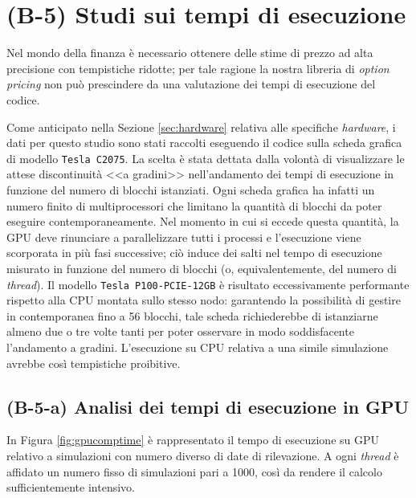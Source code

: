 \section{(B-5) Studi sui tempi di esecuzione} \label{sec:comptime}

Nel mondo della finanza è necessario ottenere delle stime di prezzo ad alta precisione con tempistiche ridotte; per tale ragione la nostra libreria di \textit{option pricing} non può prescindere da una valutazione dei tempi di esecuzione del codice.

Come anticipato nella Sezione \ref{sec:hardware} relativa alle specifiche \textit{hardware}, i dati per questo studio sono stati raccolti eseguendo il codice sulla scheda grafica di modello \verb|Tesla C2075|. La scelta è stata dettata dalla volontà di visualizzare le attese discontinuità <<a gradini>> nell'andamento dei tempi di esecuzione in funzione del numero di blocchi istanziati. Ogni scheda grafica ha infatti un numero finito di multiprocessori che limitano la quantità di blocchi da poter eseguire contemporaneamente. Nel momento in cui si eccede questa quantità, la GPU deve rinunciare a parallelizzare tutti i processi e l'esecuzione viene scorporata in più fasi successive; ciò induce dei salti nel tempo di esecuzione misurato in funzione del numero di blocchi (o, equivalentemente, del numero di \textit{thread}).
Il modello \verb|Tesla P100-PCIE-12GB| è risultato eccessivamente performante rispetto alla CPU montata sullo stesso nodo: garantendo la possibilità di gestire in contemporanea fino a 56 blocchi, tale scheda richiederebbe di istanziarne almeno due o tre volte tanti per poter osservare in modo soddisfacente l'andamento a gradini. L'esecuzione su CPU relativa a una simile simulazione avrebbe così tempistiche proibitive.

\subsection{(B-5-a) Analisi dei tempi di esecuzione in GPU}
In Figura \ref{fig:gpucomptime} è rappresentato il tempo di esecuzione su GPU relativo a simulazioni con numero diverso di date di rilevazione. A ogni \textit{thread} è affidato un numero fisso di simulazioni pari a 1000, così da rendere il calcolo sufficientemente intensivo.

